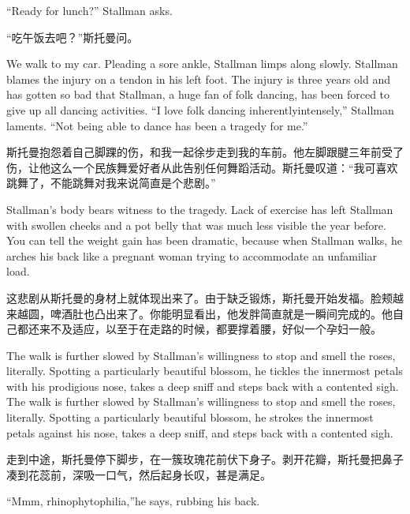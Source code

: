 \ifdefined\eng
``Ready for lunch?'' Stallman asks.
\fi

\ifdefined\chs
``吃午饭去吧？''斯托曼问。
\fi

\ifdefined\eng
We walk to my car. Pleading a sore ankle, Stallman limps along slowly. Stallman blames the injury on a tendon in his left foot. The injury is three years old and has gotten so bad that Stallman, a huge fan of folk dancing, has been forced to give up all dancing activities. ``I love folk dancing \ifdefined\vone inherently\fi\ifdefined\vtwo intensely\fi ,'' Stallman laments. ``Not being able to dance has been a tragedy for me.''
\fi

\ifdefined\chs
斯托曼抱怨着自己脚踝的伤，和我一起徐步走到我的车前。他左脚跟腱三年前受了伤，让他这么一个民族舞爱好者从此告别任何舞蹈活动。斯托曼叹道：``我可喜欢跳舞了，不能跳舞对我来说简直是个悲剧。''
\fi

\ifdefined\eng
Stallman's body bears witness to the tragedy. Lack of exercise has left Stallman with swollen cheeks and a pot belly that was much less visible the year before. You can tell the weight gain has been dramatic, because when Stallman walks, he arches his back like a pregnant woman trying to accommodate an unfamiliar load.
\fi

\ifdefined\chs
这悲剧从斯托曼的身材上就体现出来了。由于缺乏锻炼，斯托曼开始发福。脸颊越来越圆，啤酒肚也凸出来了。你能明显看出，他发胖简直就是一瞬间完成的。他自己都还来不及适应，以至于在走路的时候，都要撑着腰，好似一个孕妇一般。
\fi

\ifdefined\eng
\ifdefined\vone
The walk is further slowed by Stallman's willingness to stop and smell the roses, literally. Spotting a particularly beautiful blossom, he tickles the innermost petals with his prodigious nose, takes a deep sniff and steps back with a contented sigh.
\fi
\ifdefined\vtwo
The walk is further slowed by Stallman's willingness to stop and smell the roses, literally. Spotting a particularly beautiful blossom, he strokes the innermost petals against his nose, takes a deep sniff, and steps back with a contented sigh.
\fi
\fi

\ifdefined\chs
走到中途，斯托曼停下脚步，在一簇玫瑰花前伏下身子。剥开花瓣，斯托曼把鼻子凑到花蕊前，深吸一口气，然后起身长叹，甚是满足。
\fi

\ifdefined\eng
``Mmm, rhinophytophilia,''\ifdefined\vone{}\fi  he says, rubbing his back.\ifdefined\vtwo{}\fi
\fi

